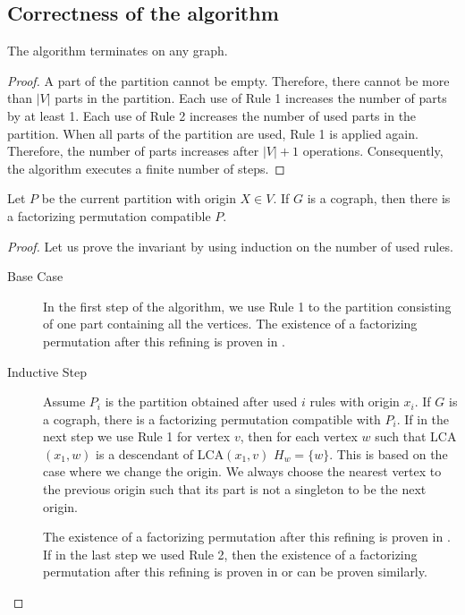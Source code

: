 \subsection{Correctness of the algorithm}

\begin{theorem}
    The algorithm terminates on any graph.
\end{theorem}

\begin{proof}
A part of the partition cannot be empty. Therefore, there cannot be more than $|V|$ parts in the partition.
Each use of Rule 1 increases the number of parts by at least 1.
Each use of Rule 2 increases the number of used parts in the partition. When all parts of the partition are used, Rule 1 is applied again.
Therefore, the number of parts increases after $|V|+1$ operations. Consequently, the algorithm executes a finite number of steps.
\end{proof}
\begin{invariant}
    Let $P$ be the current partition with origin $X \in V$. If $G$ is a cograph, then there is a factorizing permutation compatible $P$.
\end{invariant}

\begin{proof}
Let us prove the invariant by using induction on the number of used rules.

\begin{description}
    \item [Base Case] In the first step of the algorithm, we use Rule 1 to the partition consisting of one part containing all the vertices. The existence of a factorizing permutation after this refining is proven in .
    \item [Inductive Step] Assume $P_i$ is the partition obtained after used $i$ rules with origin $x_i$. If $G$ is a cograph, there is a factorizing permutation compatible with $P_i$. If in the next step we use Rule 1 for vertex $v$, then for each vertex $w$ such that LCA$(x_1,w)$ is a descendant of LCA$(x_1,v)$ $H_w=\{w\}$. This is based on the case where we change the origin. We always choose the nearest vertex to the previous origin such that its part is not a singleton to be the next origin.

    The existence of a factorizing permutation after this refining is proven in . If in the last step we used Rule 2, then the existence of a factorizing permutation after this refining is proven in  or can be proven similarly.
\end{description}


\end{proof}

